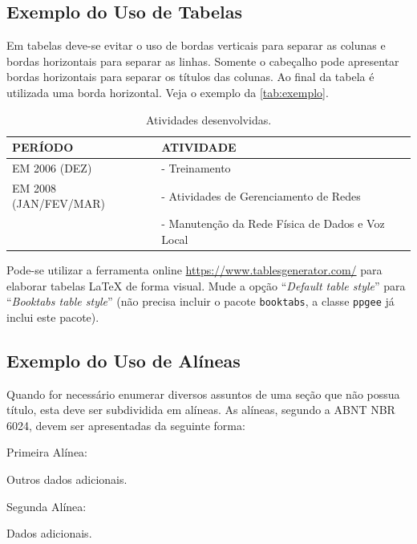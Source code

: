 \subsection{Exemplo do Uso de Tabelas}

Em tabelas deve-se evitar o uso de bordas verticais para separar as colunas e bordas horizontais para separar as linhas. Somente o cabeçalho pode apresentar bordas horizontais para separar os títulos das colunas. Ao final da tabela é utilizada uma borda horizontal. Veja o exemplo da \autoref{tab:exemplo}.

\begin{table}[htb]
    \centering
    \caption{\label{tab:exemplo} Atividades desenvolvidas.}
    \begin{tabular}{ll}
        \toprule
        PERÍODO & ATIVIDADE \\
        \midrule
        EM 2006 (DEZ) & - Treinamento\\
        EM 2008 (JAN/FEV/MAR) & - Atividades de Gerenciamento de Redes\\
        & - Manutenção da Rede Física de Dados e Voz Local\\
        \bottomrule
    \end{tabular}
\end{table}

Pode-se utilizar a ferramenta online \url{https://www.tablesgenerator.com/} para elaborar tabelas \LaTeX{} de forma visual. Mude a opção ``\textit{Default table style}'' para ``\textit{Booktabs table style}'' (não precisa incluir o pacote \texttt{booktabs}, a classe \texttt{ppgee} já inclui este pacote).

\subsection{Exemplo do Uso de Alíneas}

Quando for necessário enumerar diversos assuntos de uma seção que não possua título, esta deve ser subdividida em alíneas. As alíneas, segundo a ABNT NBR 6024, devem ser apresentadas da seguinte forma:

\begin{alineas}
    \item Primeira Alínea:
    \begin{subalineas}
        \item Outros dados adicionais.
    \end{subalineas}
    
    \item Segunda Alínea:
    \begin{subalineas}
        \item Dados adicionais.
    \end{subalineas}
\end{alineas}


